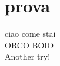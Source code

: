 \documentclass{article}
\begin{document}
    \section{prova}
        ciao come stai\\
        ORCO BOIO\\
        Another try!
\end{document}
